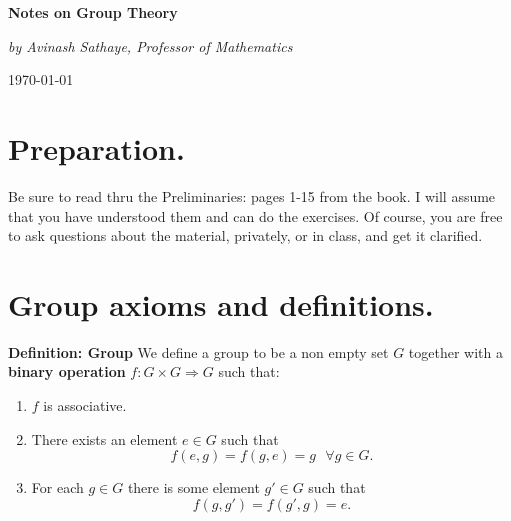 \documentclass[12pt]{article}
\newcommand{\deff}[1]{{\bf Definition: #1} }
\newcommand{\nextpage}{\vspace*{\fill}\newpage}
\begin{document}
\begin{titlepage}
    \vspace*{.5in}
    \begin{center}
{\Huge\bf Notes on Group Theory}

\vspace{1in}
{\sl by Avinash Sathaye, Professor of Mathematics }


     {\today}
     \end{center}

     \nextpage
         
     \end{titlepage}

\tableofcontents
\nextpage

\section{Preparation.} Be sure to read thru the Preliminaries: pages
1-15 from the book. I will assume that you have understood them and can
do the exercises. Of course, you are free to ask questions about the
material, privately, or in class, and get it clarified.

\section{Group axioms and definitions.}

\deff{Group}
We define a group to be a non empty set $G$ together with a {\bf binary
operation}
$f:G\times G \Rightarrow G$ such that:
\begin{enumerate}
\item $f$ is associative.
\item There exists an element $e\in G$ such that
$$f(e,g)=f(g,e) = g ~~~\forall g\in G.$$
\item For each $g\in G$ there is some element $g'\in G$ such that
$$f(g,g')=f(g',g)=e.$$
\end{enumerate}
\end{document}
